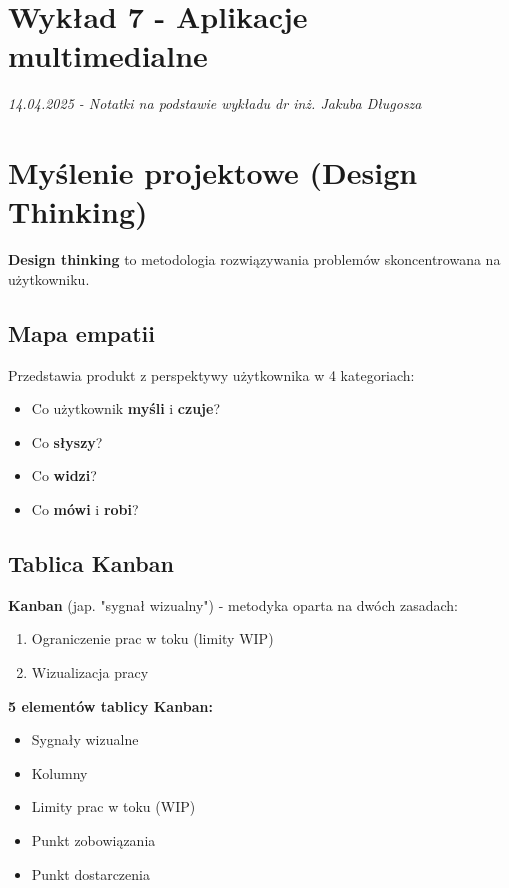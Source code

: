 \section*{Wykład 7 - Aplikacje multimedialne}
\textit{14.04.2025 - Notatki na podstawie wykładu dr inż. Jakuba Długosza}

\section{Myślenie projektowe (Design Thinking)}
\textbf{Design thinking} to metodologia rozwiązywania problemów skoncentrowana na użytkowniku.

\subsection{Mapa empatii}
Przedstawia produkt z perspektywy użytkownika w 4 kategoriach:
\begin{itemize}[noitemsep]
    \item Co użytkownik \textbf{myśli} i \textbf{czuje}?
    \item Co \textbf{słyszy}?
    \item Co \textbf{widzi}?
    \item Co \textbf{mówi} i \textbf{robi}?
\end{itemize}

\subsection{Tablica Kanban}
\textbf{Kanban} (jap. "sygnał wizualny") - metodyka oparta na dwóch zasadach:
\begin{enumerate}[noitemsep]
    \item Ograniczenie prac w toku (limity WIP)
    \item Wizualizacja pracy
\end{enumerate}

\textbf{5 elementów tablicy Kanban:}
\begin{itemize}[noitemsep]
    \item Sygnały wizualne
    \item Kolumny
    \item Limity prac w toku (WIP)
    \item Punkt zobowiązania
    \item Punkt dostarczenia
\end{itemize}

